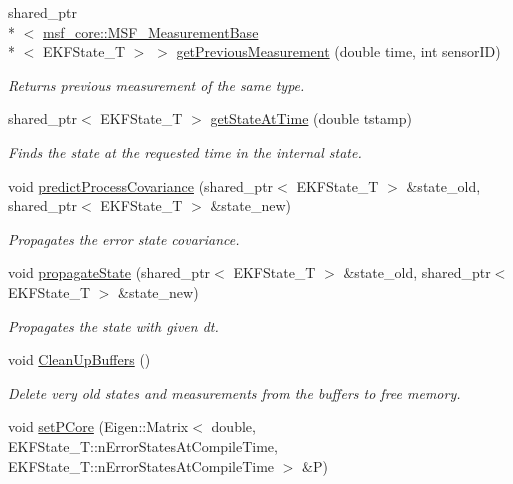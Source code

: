 \begin{DoxyCompactItemize}
shared\-\_\-ptr\\*
$<$ \hyperlink{classmsf__core_1_1MSF__MeasurementBase}{msf\-\_\-core\-::\-M\-S\-F\-\_\-\-Measurement\-Base}\\*
$<$ E\-K\-F\-State\-\_\-\-T $>$ $>$ \hyperlink{classmsf__core_1_1MSF__Core_a9c6b7908fbc66dd2aebb2f08e7c0c4ff}{get\-Previous\-Measurement} (double time, int sensor\-I\-D)
\begin{DoxyCompactList}\small\item\em Returns previous measurement of the same type. \end{DoxyCompactList}\item 
shared\-\_\-ptr$<$ E\-K\-F\-State\-\_\-\-T $>$ \hyperlink{classmsf__core_1_1MSF__Core_a759141ac2b7e8722e2c32a28490654fb}{get\-State\-At\-Time} (double tstamp)
\begin{DoxyCompactList}\small\item\em Finds the state at the requested time in the internal state. \end{DoxyCompactList}\item 
void \hyperlink{classmsf__core_1_1MSF__Core_aef8ea1eb9aedc8c196d4cc9a8411f77a}{predict\-Process\-Covariance} (shared\-\_\-ptr$<$ E\-K\-F\-State\-\_\-\-T $>$ \&state\-\_\-old, shared\-\_\-ptr$<$ E\-K\-F\-State\-\_\-\-T $>$ \&state\-\_\-new)
\begin{DoxyCompactList}\small\item\em Propagates the error state covariance. \end{DoxyCompactList}\item 
void \hyperlink{classmsf__core_1_1MSF__Core_a37342ed8ed1b25628ca423b20c95c9e0}{propagate\-State} (shared\-\_\-ptr$<$ E\-K\-F\-State\-\_\-\-T $>$ \&state\-\_\-old, shared\-\_\-ptr$<$ E\-K\-F\-State\-\_\-\-T $>$ \&state\-\_\-new)
\begin{DoxyCompactList}\small\item\em Propagates the state with given dt. \end{DoxyCompactList}\item 
void \hyperlink{classmsf__core_1_1MSF__Core_ac5cd6f27e1965b7416bb4b847c72c2e6}{Clean\-Up\-Buffers} ()
\begin{DoxyCompactList}\small\item\em Delete very old states and measurements from the buffers to free memory. \end{DoxyCompactList}\item 
void \hyperlink{classmsf__core_1_1MSF__Core_a5f520250e12d56a8950f4fc355e58d69}{set\-P\-Core} (Eigen\-::\-Matrix$<$ double, E\-K\-F\-State\-\_\-\-T\-::n\-Error\-States\-At\-Compile\-Time, E\-K\-F\-State\-\_\-\-T\-::n\-Error\-States\-At\-Compile\-Time $>$ \&P)

\end{DoxyCompactItemize}
